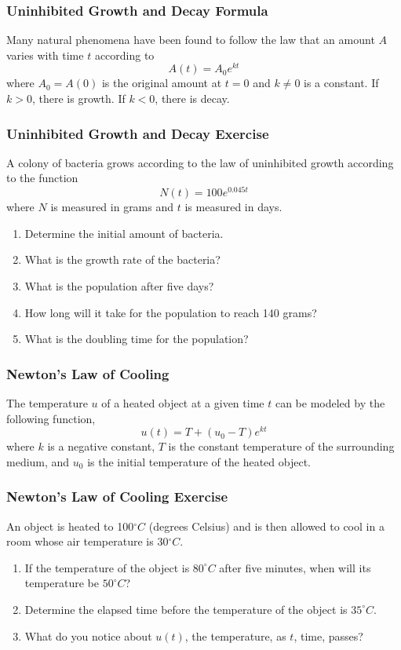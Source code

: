 \documentclass[xcolor=dvipsnames]{beamer}
\begin{document}
\begin{frame}
  \frametitle{Uninhibited Growth and Decay Formula}
Many natural phenomena have been found to follow the law that an
amount $A$ varies with time $t$ according to
\begin{equation}
  \label{eq:peifaiva}
  A(t)=A_{0}e^{kt}
\end{equation}
where $A_{0}=A(0)$ is the original amount at $t=0$ and $k\neq{}0$ is a
constant. If $k>0$, there is growth. If $k<0$, there is decay.
\end{frame}

\begin{frame}
  \frametitle{Uninhibited Growth and Decay Exercise}
{\ubung} A colony of bacteria grows according to the law of uninhibited growth
according to the function
\begin{equation}
  \label{eq:chiowezo}
  N(t)=100e^{0.045t}
\end{equation}
where $N$ is measured in grams and $t$ is measured in days.
  \begin{enumerate}
  \item Determine the initial amount of bacteria.
  \item What is the growth rate of the bacteria?
  \item What is the population after five days?
  \item How long will it take for the population to reach 140
    grams?
  \item What is the doubling time for the population?
  \end{enumerate}
\end{frame}

\begin{frame}
  \frametitle{Newton's Law of Cooling}
The temperature $u$ of a heated object at a given time $t$ can be
modeled by the following function,
\begin{equation}
  \label{eq:iemahbec}
  u(t)=T+(u_{0}-T)e^{kt}
\end{equation}
where $k$ is a negative constant, $T$ is the constant temperature of
the surrounding medium, and $u_{0}$ is the initial temperature of the
heated object.
\end{frame}

\begin{frame}
  \frametitle{Newton's Law of Cooling Exercise}
{\ubung} An object is heated to 100$^{\circ}C$ (degrees Celsius) and is then
allowed to cool in a room whose air temperature is 30$^{\circ}C$.
\begin{enumerate}
\item If the temperature of the object is $80^{\circ}C$ after five
  minutes, when will its temperature be $50^{\circ}C$?
\item Determine the elapsed time before the temperature of the
  object is $35^{\circ}C$.
\item What do you notice about $u(t)$, the temperature, as $t$,
  time, passes?
\end{enumerate}
\end{frame}
\end{document}
